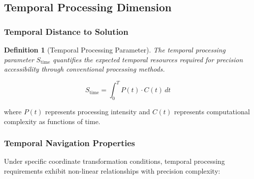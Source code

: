 \documentclass[12pt,a4paper]{article}
\newtheorem{definition}[theorem]{Definition}
\begin{document}
{\subsection{Temporal Processing Dimension}

\subsubsection{Temporal Distance to Solution}

\begin{definition}[Temporal Processing Parameter]
The temporal processing parameter $S_{\text{time}}$ quantifies the expected temporal resources required for precision accessibility through conventional processing methods.
\end{definition}

\begin{equation}
S_{\text{time}} = \int_0^T P(t) \cdot C(t) \, dt
\label{eq:temporal_processing}
\end{equation}

where $P(t)$ represents processing intensity and $C(t)$ represents computational complexity as functions of time.

\subsubsection{Temporal Navigation Properties}

Under specific coordinate transformation conditions, temporal processing requirements exhibit non-linear relationships with precision complexity:

\begin{figure}[H]
\centering
{}
\end{figure}}
\end{document}
